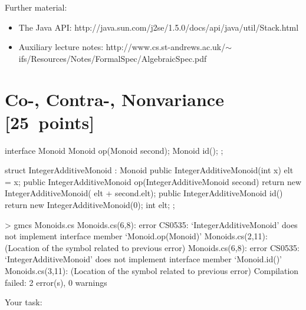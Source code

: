 \documentclass{article}
\begin{document}
Further material:
\begin{itemize}
\item The Java API:
\textsf{http://java.sun.com/j2se/1.5.0/docs/api/java/util/Stack.html}
\item Auxiliary lecture notes:
\textsf{http://www.cs.st-andrews.ac.uk/$\sim$ifs/Resources/Notes/FormalSpec/AlgebraicSpec.pdf}
\end{itemize}


\newpage
\section{Co-, Contra-, Nonvariance [25~points]}


\begin{java}
interface Monoid {
   Monoid op(Monoid second);
   Monoid id();
};

struct IntegerAdditiveMonoid : Monoid {
    public IntegerAdditiveMonoid(int x) { 
         elt = x;
    }    
    public IntegerAdditiveMonoid op(IntegerAdditiveMonoid second) { 
         return new IntegerAdditiveMonoid(
             elt + second.elt); 
    }
    public IntegerAdditiveMonoid id(){ 
         return new IntegerAdditiveMonoid(0);
    }
    int elt;
};

> gmcs Monoids.cs 
Monoids.cs(6,8): error CS0535: `IntegerAdditiveMonoid' does not implement 
  interface member `Monoid.op(Monoid)'
Monoids.cs(2,11): (Location of the symbol related to previous error)
Monoids.cs(6,8): error CS0535: `IntegerAdditiveMonoid' does not implement 
  interface member `Monoid.id()'
Monoids.cs(3,11): (Location of the symbol related to previous error)
Compilation failed: 2 error(s), 0 warnings

\end{java}
%
Your task:
\end{document}
